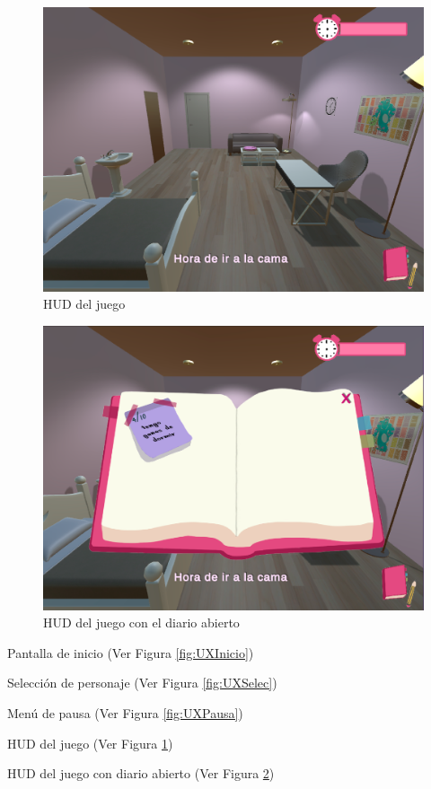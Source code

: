 \documentclass[12pt, a4paper,twoside,titlepage]{book}
\begin{document}
\begin{figure}
	\centering
	\includegraphics[width=.8\linewidth]{TGF/Artes/UX basic.png}
	\caption{HUD del juego}
	\label{fig:UXHUD}
\end{figure}

\begin{figure}
	\centering
	\includegraphics[width=.8\linewidth]{TGF/Artes/UX diario abierto.png}
	\caption{HUD del juego con el diario abierto}
	\label{fig:UXHUD2}
\end{figure}




Pantalla de inicio (Ver Figura \ref{fig:UXInicio})

Selección de personaje (Ver Figura \ref{fig:UXSelec})

Menú de pausa (Ver Figura \ref{fig:UXPausa})

HUD del juego (Ver Figura \ref{fig:UXHUD})

HUD del juego con diario abierto (Ver Figura \ref{fig:UXHUD2})
\end{document}
